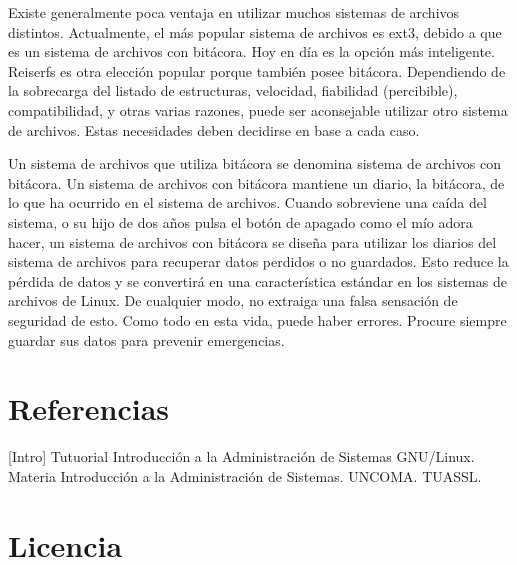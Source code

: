 \documentclass[12pt]{article}
\begin{document}
Existe generalmente poca ventaja en utilizar muchos sistemas de archivos distintos. Actualmente, el más popular sistema de archivos es ext3, debido a que es un sistema de archivos con bitácora. Hoy en día es la opción más inteligente. Reiserfs es otra elección popular porque también posee bitácora. Dependiendo de la sobrecarga del listado de estructuras, velocidad, fiabilidad (percibible), compatibilidad, y otras varias razones, puede ser aconsejable utilizar otro sistema de archivos. Estas necesidades deben decidirse en base a cada caso.

Un sistema de archivos que utiliza bitácora se denomina sistema de archivos con bitácora. Un sistema de archivos con bitácora mantiene un diario, la bitácora, de lo que ha ocurrido en el sistema de archivos. Cuando sobreviene una caída del sistema, o su hijo de dos años pulsa el botón de apagado como el mío adora hacer, un sistema de archivos con bitácora se diseña para utilizar los diarios del sistema de archivos para recuperar datos perdidos o no guardados. Esto reduce la pérdida de datos y se convertirá en una característica estándar en los sistemas de archivos de Linux. De cualquier modo, no extraiga una falsa sensación de seguridad de esto. Como todo en esta vida, puede haber errores. Procure siempre guardar sus datos para prevenir emergencias.



\section*{Referencias}

[Intro] Tutuorial Introducción a la Administración de Sistemas GNU/Linux. Materia Introducción
a la Administración de Sistemas. UNCOMA. TUASSL. 

\section*{Licencia}
\end{document}
